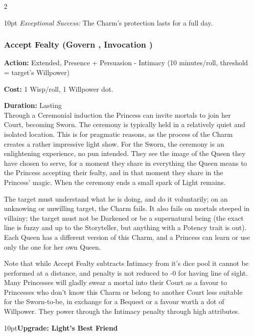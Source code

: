 \begin{multicols}{2}
\begin{myindentpar}{10pt}
    \emph{Exceptional Success:} The Charm's protection lasts for a full day.\end{myindentpar}


\subsubsection*{Accept Fealty (Govern \textbullet\textbullet, Invocation \textbullet\textbullet\textbullet)}

\noindent \textbf{Action:} Extended, Presence + Persuasion - Intimacy (10 minutes/roll, threshold = target's Willpower)

\noindent \textbf{Cost:} 1 Wisp/roll, 1 Willpower dot.

\noindent \textbf{Duration:} Lasting \\

\noindent Through a Ceremonial induction the Princess can invite mortals to join her Court, becoming Sworn. The ceremony is typically held in a relatively quiet and isolated location. This is for pragmatic reasons, as the process of the Charm creates a rather impressive light show. For the Sworn, the ceremony is an enlightening experience, no pun intended. They see the image of the Queen they have chosen to serve, for a moment they share in everything the Queen means to the Princess accepting their fealty, and in that moment they share in the Princess' magic. When the ceremony ends a small spark of Light remains.

The target must understand what he is doing, and do it voluntarily; on an unknowing or unwilling target, the Charm fails. It also fails on mortals steeped in villainy; the target must not be Darkened or be a supernatural being (the exact line is fuzzy and up to the Storyteller, but anything with a Potency trait is out). Each Queen has a different version of this Charm, and a Princess can learn or use only the one for her own Queen.

Note that while Accept Fealty subtracts Intimacy from it's dice pool it cannot be performed at a distance, and penalty is not reduced to -0 for having line of sight. Many Princesses will gladly swear a mortal into their Court as a favour to Princesses who don't know this Charm or belong to another Court less suitable for the Sworn-to-be, in exchange for a Bequest or a favour worth a dot of Willpower. They power through the Intimacy penalty through high attributes. 

\begin{myindentpar}{10pt}\textbf{Upgrade: Light's Best Friend}


\end{myindentpar}
\end{multicols}
